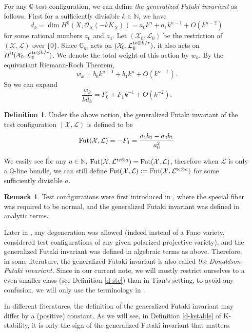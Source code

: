 \documentclass[12pt,reqno]{amsart}%
\newcommand{\cX}{{\mathcal{X}}}
\newcommand{\cL}{{\mathcal{L}}}
\theoremstyle{definition}
\newtheorem{defn}[thm]{Definition}
\newtheorem{rem}[thm]{Remark}
\theoremstyle{remark}
\newcommand{\Fut}{{\rm Fut}}
\begin{document}
For any $\mathbb{Q}$-test configuration, we can define {\it the generalized Futaki
invariant} as follows. First   for a sufficiently divisible $k\in\mathbb{N}$, we have
\[
d_k=\dim H^0(X, \mathcal{O}_X(-kK_{X}))=a_0k^n+a_1k^{n-1}+O(k^{n-2})
\]
for some rational numbers $a_0$ and $a_1$. Let
$(\cX_0,\cL_0)$ be the restriction of $(\cX,
\cL)$ over $\{0\}$. Since $\mathbb{G}_m$ acts on $(\cX_0,\cL^{{\rm tc}\otimes k/r}_0)$, it also acts on
$H^0(\cX_0,\cL^{{\rm tc}\otimes k/r}_0)$. We denote the total
weight of this action by $w_k$. By the equivariant Riemann-Roch
Theorem,
\[
w_k=b_0k^{n+1}+b_1k^{n}+O(k^{n-1}).
\]
So we can expand
\[
\frac{w_k}{kd_k}=F_0+F_1k^{-1}+O(k^{-2}).
\]
\begin{defn}\label{d-futaki}
Under the above notion, the generalized Futaki invariant of the test configuration $(\cX, \cL)$ is defined to be
\begin{equation}\label{deffut}
\Fut(\cX,\cL)=-{F_1}=\frac{a_1b_0-a_0b_1}{a_0^2}
\end{equation}
\end{defn}

We easily see for any  $a\in \mathbb{N}$, 
$\Fut(\cX,\cL^{{\rm tc}\otimes a})= \Fut(\cX,\cL)$, therefore when $\cL$ is only a $\mathbb{Q}$-line bundle, we can still define
$\Fut(\cX,\cL):=\Fut(\cX,\cL^{{\rm tc} \otimes a})$ for some sufficiently divisible $a$.

\begin{rem}\label{r-tcvsstc}
Test configurations were first introduced in \cite{Tia97}, where the special fiber was required to be normal, and the generalized Futaki invariant was defined in analytic terms. 

Later in \cite{Don02}, any degeneration was allowed (indeed instead of a Fano variety, \cite{Don02} considered test configurations of any given polarized projective variety), and the generalized Futaki invariant was defined in algebraic terms as above. Therefore, in some literature, the generalized Futaki invariant is also called {\it the Donaldson-Futaki invariant.} Since in our current note, we will mostly restrict ourselves to a even smaller class (see Definition \ref{d-stc}) than in Tian's setting, to avoid any confusion, we will only use the terminology in \cite{Tia97}. 

In different literatures,  the definition of the generalized Futaki invariant may differ by a (positive) constant. As we will see, in Definition \ref{d-kstable} of K-stability, it is only the sign of the generalized Futaki invariant that matters. %
\end{rem}
\end{document}
